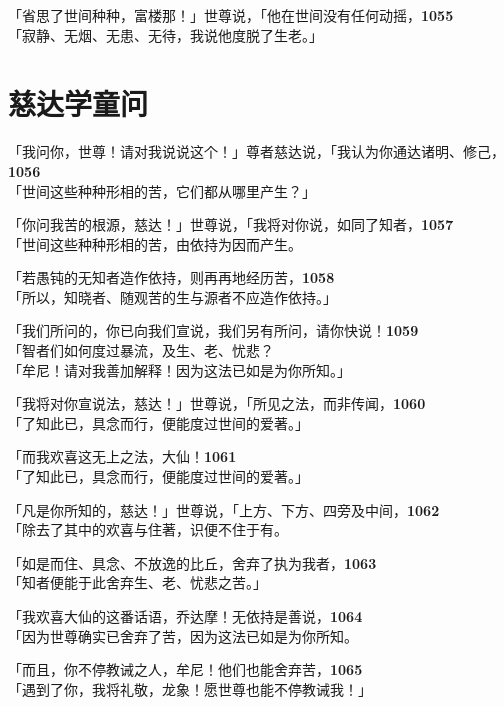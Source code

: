 「省思了世间种种，富楼那！」世尊说，「他在世间没有任何动摇，\hfill{\grayfootnotesize \textbf{1055}} \\
「寂静、无烟、无患、无待，我说他度脱了生老。」


\section{慈达学童问}

「我问你，世尊！请对我说说这个！」尊者慈达说，「我认为你通达诸明、修己，\hfill{\grayfootnotesize \textbf{1056}} \\
「世间这些种种形相的苦，它们都从哪里产生？」

「你问我苦的根源，慈达！」世尊说，「我将对你说，如同了知者，\hfill{\grayfootnotesize \textbf{1057}} \\
「世间这些种种形相的苦，由依持为因而产生。


「若愚钝的无知者造作依持，则再再地经历苦，\hfill{\grayfootnotesize \textbf{1058}} \\
「所以，知晓者、随观苦的生与源者不应造作依持。」


「我们所问的，你已向我们宣说，我们另有所问，请你快说！\hfill{\grayfootnotesize \textbf{1059}} \\
「智者们如何度过暴流，及生、老、忧悲？\\
「牟尼！请对我善加解释！因为这法已如是为你所知。」


「我将对你宣说法，慈达！」世尊说，「所见之法，而非传闻，\hfill{\grayfootnotesize \textbf{1060}} \\
「了知此已，具念而行，便能度过世间的爱著。」


「而我欢喜这无上之法，大仙！\hfill{\grayfootnotesize \textbf{1061}} \\
「了知此已，具念而行，便能度过世间的爱著。」


「凡是你所知的，慈达！」世尊说，「上方、下方、四旁及中间，\hfill{\grayfootnotesize \textbf{1062}} \\
「除去了其中的欢喜与住著，识便不住于有。


「如是而住、具念、不放逸的比丘，舍弃了执为我者，\hfill{\grayfootnotesize \textbf{1063}} \\
「知者便能于此舍弃生、老、忧悲之苦。」


「我欢喜大仙的这番话语，乔达摩！无依持是善说，\hfill{\grayfootnotesize \textbf{1064}} \\
「因为世尊确实已舍弃了苦，因为这法已如是为你所知。


「而且，你不停教诫之人，牟尼！他们也能舍弃苦，\hfill{\grayfootnotesize \textbf{1065}} \\
「遇到了你，我将礼敬，龙象！愿世尊也能不停教诫我！」


